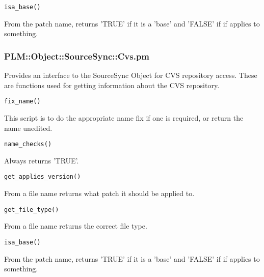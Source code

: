 \begin{verbatim}
isa_base()
\end{verbatim}
From the patch name, returns 'TRUE' if it is a 'base' and 'FALSE' if if applies to something.

\subsubsection{PLM::Object::SourceSync::Cvs.pm}
Provides an interface to the SourceSync Object for CVS repository access.   These are functions used for getting information about the CVS repository.

\begin{verbatim}
fix_name()
\end{verbatim}
This script is to do the appropriate name fix if one is required, or return the name unedited.

\begin{verbatim}
name_checks()
\end{verbatim}
Always returns 'TRUE'.

\begin{verbatim}
get_applies_version()
\end{verbatim}
From a file name returns what patch it should be applied to.

\begin{verbatim}
get_file_type()
\end{verbatim}
From a file name returns the correct file type.

\begin{verbatim}
isa_base()
\end{verbatim}
From the patch name, returns 'TRUE' if it is a 'base' and 'FALSE' if if applies to something.

